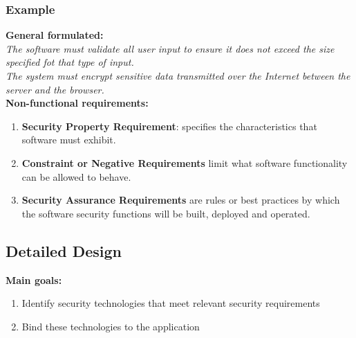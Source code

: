 \subsubsection{Example}
\textbf{General formulated:}\\
\textit{The software must validate all user input to ensure it does not exceed the size specified fot that type of input.}\\
\textit{The system must encrypt sensitive data transmitted over the Internet between the server and the browser.}\\
\textbf{Non-functional requirements:}
\begin{enumerate}
    \item \textbf{Security Property Requirement}: specifies the characteristics that software must exhibit.
    \item \textbf{Constraint or Negative Requirements} limit what software functionality can be allowed to behave.
    \item \textbf{Security Assurance Requirements} are rules or best practices by which the software security functions will be built, deployed and operated.
\end{enumerate}

\subsection{Detailed Design}
\textbf{Main goals:}\\
\begin{enumerate}
    \item Identify security technologies that meet relevant security requirements
    \item Bind these technologies to the application
\end{enumerate}

